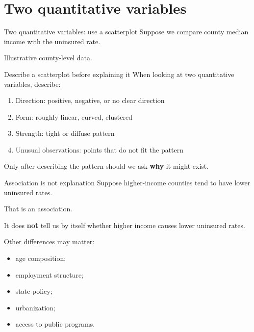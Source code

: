 \documentclass[11pt,aspectratio=169]{beamer}
\begin{document}
\section{Two quantitative variables}

\begin{frame}{Two quantitative variables: use a scatterplot}
Suppose we compare county median income with the uninsured rate.

\begin{center}
\end{center}

\small Illustrative county-level data.
\end{frame}

\begin{frame}{Describe a scatterplot before explaining it}
When looking at two quantitative variables, describe:

\begin{enumerate}
  \item \alert{Direction}: positive, negative, or no clear direction
  \item \alert{Form}: roughly linear, curved, clustered
  \item \alert{Strength}: tight or diffuse pattern
  \item \alert{Unusual observations}: points that do not fit the pattern
\end{enumerate}

\vspace{0.6em}
Only after describing the pattern should we ask \textbf{why} it might exist.
\end{frame}

\begin{frame}{Association is not explanation}
Suppose higher-income counties tend to have lower uninsured rates.

That is an \alert{association}.

It does \textbf{not} tell us by itself whether higher income causes lower uninsured rates.

\vspace{0.6em}
Other differences may matter:
\begin{itemize}
  \item age composition;
  \item employment structure;
  \item state policy;
  \item urbanization;
  \item access to public programs.
\end{itemize}
\end{frame}
\end{document}
